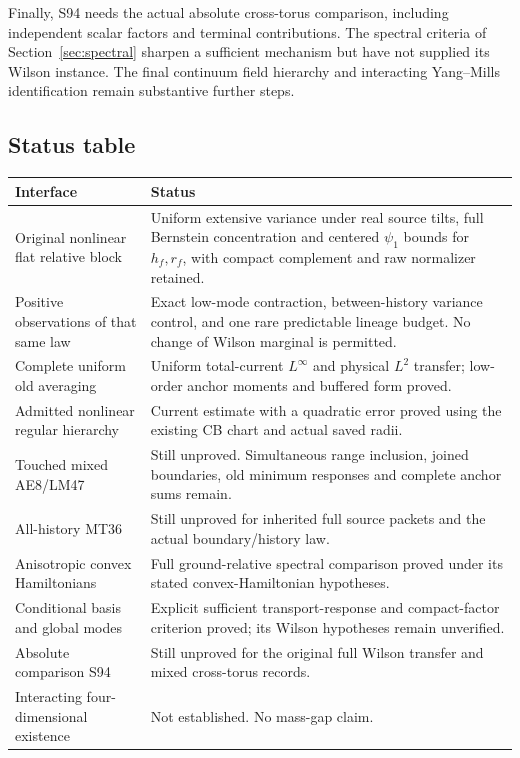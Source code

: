 \documentclass[11pt,letterpaper]{article}
\numberwithin{equation}{section}
\theoremstyle{definition}\newtheorem{definition}[theorem]{Definition}
\theoremstyle{remark}\newtheorem{remark}[theorem]{Remark}
\begin{document}
Finally, S94 needs the actual absolute cross-torus comparison, including independent scalar factors and terminal contributions. The spectral criteria of Section~\ref{sec:spectral} sharpen a sufficient mechanism but have not supplied its Wilson instance. The final continuum field hierarchy and interacting Yang--Mills identification remain substantive further steps.

\subsection{Status table}

\renewcommand{\arraystretch}{1.17}
\begin{longtable}{p{}p{}}
\toprule
Interface & Status\\
\midrule
\endhead
Original nonlinear flat relative block & Uniform extensive variance under real source tilts, full Bernstein concentration and centered $\psi_1$ bounds for $h_f,r_f$, with compact complement and raw normalizer retained.\\
Positive observations of that same law & Exact low-mode contraction, between-history variance control, and one rare predictable lineage budget. No change of Wilson marginal is permitted.\\
Complete uniform old averaging & Uniform total-current $L^\infty$ and physical $L^2$ transfer; low-order anchor moments and buffered form proved.\\
Admitted nonlinear regular hierarchy & Current estimate with a quadratic error proved using the existing CB chart and actual saved radii.\\
Touched mixed AE8/LM47 & Still unproved. Simultaneous range inclusion, joined boundaries, old minimum responses and complete anchor sums remain.\\
All-history MT36 & Still unproved for inherited full source packets and the actual boundary/history law.\\
Anisotropic convex Hamiltonians & Full ground-relative spectral comparison proved under its stated convex-Hamiltonian hypotheses.\\
Conditional basis and global modes & Explicit sufficient transport-response and compact-factor criterion proved; its Wilson hypotheses remain unverified.\\
Absolute comparison S94 & Still unproved for the original full Wilson transfer and mixed cross-torus records.\\
Interacting four-dimensional existence & Not established. No mass-gap claim.\\
\bottomrule
\end{longtable}
\end{document}
